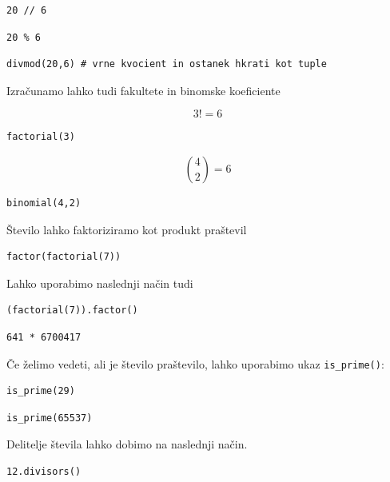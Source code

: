 \begin{verbatim}
20 // 6
\end{verbatim}

\begin{verbatim}
20 % 6
\end{verbatim}

\begin{verbatim}
divmod(20,6) # vrne kvocient in ostanek hkrati kot tuple
\end{verbatim}

Izračunamo lahko tudi fakultete in binomske koeficiente

\begin{equation}
3!=6
\end{equation}

\begin{verbatim}
factorial(3)
\end{verbatim}

\begin{equation}
\binom{4}{2} = 6
\end{equation}

\begin{verbatim}
binomial(4,2)
\end{verbatim}

Število lahko faktoriziramo kot produkt praštevil

\begin{verbatim}
factor(factorial(7))
\end{verbatim}

Lahko uporabimo naslednji način tudi

\begin{verbatim}
(factorial(7)).factor()
\end{verbatim}

\begin{verbatim}
641 * 6700417
\end{verbatim}

Če želimo vedeti, ali je število praštevilo, lahko uporabimo ukaz \texttt{is\_prime()}:

\begin{verbatim}
is_prime(29)
\end{verbatim}

\begin{verbatim}
is_prime(65537)
\end{verbatim}

Delitelje števila lahko dobimo na naslednji način.

\begin{verbatim}
12.divisors()
\end{verbatim}

